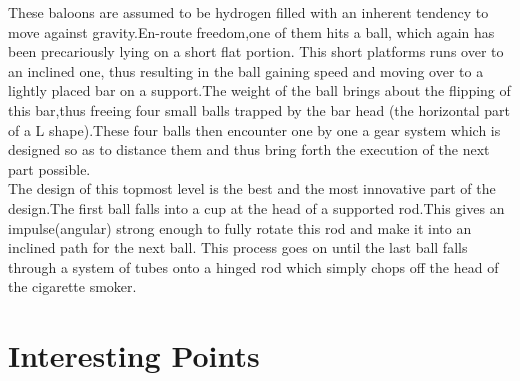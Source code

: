 \documentclass[11pt]{article}
\begin{document}
These baloons are assumed to be hydrogen filled with an inherent tendency to move against gravity.En-route freedom,one of them hits a ball,
which again has been precariously lying on a short flat portion. This short platforms runs over to an inclined one,
thus resulting in the ball gaining speed and moving over to a lightly placed bar on a support.The weight of the ball brings
about the flipping of this bar,thus freeing four small balls trapped by the bar head (the horizontal part of a L shape).These four balls 
then encounter one by one a gear system which is designed so as to distance them and thus bring forth the execution of the next part possible.\\

The design of this topmost level is the best and the most innovative part of the design.The first ball falls into a cup at the head of a
supported rod.This gives an impulse(angular) strong enough to fully rotate this rod and make it into an inclined path for the next ball.
This process goes on until the last ball falls through a system of tubes onto a hinged rod which simply chops off the head of the cigarette smoker.\\ 


\section{Interesting Points}
\end{document}
